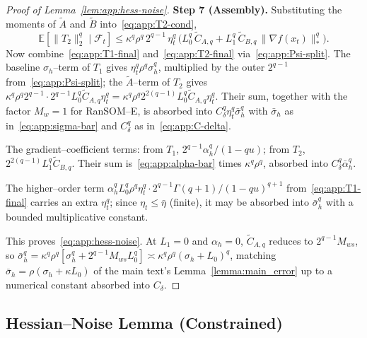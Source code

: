 \documentclass{article}
\theoremstyle{plain}
\theoremstyle{definition}
\theoremstyle{remark}
\begin{document}
\begin{proof}[Proof of Lemma~\ref{lem:app:hess-noise}]
\smallskip\noindent\textbf{Step 7 (Assembly).}
Substituting the moments of $\widetilde A$ and $\widetilde B$
into~\eqref{eq:app:T2-cond},
\begin{equation}
  \mathbb{E}[\|T_2\|_2^q \mid \mathcal{F}_t]
  \leq \kappa^q \rho^q\, 2^{q-1}\, \eta_t^q\,
    \bigl(L_0^q\, \widetilde C_{A,q}
      + L_1^q\, \widetilde C_{B,q}\, \|\nabla f(x_t)\|_*^q\bigr).
  \label{eq:app:T2-final}
\end{equation}
Now combine~\eqref{eq:app:T1-final} and~\eqref{eq:app:T2-final}
via~\eqref{eq:app:Psi-split}. The baseline $\sigma_h$--term of $T_1$
gives $\eta_t^q\rho^q\sigma_h^q$, multiplied by the outer $2^{q-1}$
from~\eqref{eq:app:Psi-split}; the $\widetilde A$--term of $T_2$ gives
$\kappa^q\rho^q 2^{q-1}\cdot 2^{q-1} L_0^q\widetilde C_{A,q}\eta_t^q =
\kappa^q\rho^q 2^{2(q-1)} L_0^q \widetilde C_{A,q}\eta_t^q$. Their sum,
together with the factor $M_w = 1$ for RanSOM--E, is absorbed into
$C_\delta^q\eta_t^q\bar\sigma_h^q$ with $\bar\sigma_h$ as
in~\eqref{eq:app:sigma-bar} and $C_\delta^q$ as
in~\eqref{eq:app:C-delta}.

The gradient--coefficient terms: from $T_1$, $2^{q-1}\alpha_h^q/(1-qu)$;
from $T_2$, $2^{2(q-1)} L_1^q\widetilde C_{B,q}$. Their sum
is~\eqref{eq:app:alpha-bar} times $\kappa^q\rho^q$, absorbed into
$C_\delta^q\bar\alpha_h^q$.

The higher--order term $\alpha_h^q L_0^q\rho^q\eta_t^q \cdot
2^{q-1}\Gamma(q+1)/(1-qu)^{q+1}$ from~\eqref{eq:app:T1-final} carries an
extra $\eta_t^q$; since $\eta_t \leq \bar\eta$ (finite), it may be
absorbed into $\bar\sigma_h^q$ with a bounded multiplicative constant.

This proves~\eqref{eq:app:hess-noise}. At $L_1 = 0$ and $\alpha_h = 0$,
$\widetilde C_{A,q}$ reduces to $2^{q-1} M_{ws}$, so $\bar\sigma_h^q =
\kappa^q\rho^q[\sigma_h^q + 2^{q-1}M_{ws} L_0^q] \asymp
\kappa^q\rho^q(\sigma_h + L_0)^q$, matching $\bar\sigma_h = \rho(\sigma_h
+ \kappa L_0)$ of the main text's Lemma~\ref{lemma:main_error} up to a
numerical constant absorbed into $C_\delta$.
\end{proof}


\subsection{Hessian--Noise Lemma (Constrained)}
\label{app:hessian-noise-constrained}
\end{document}
